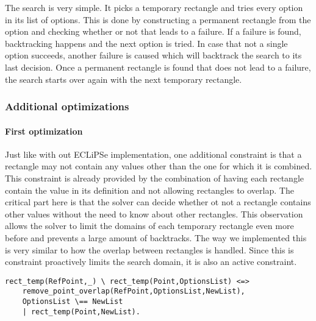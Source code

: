 The search is very simple. It picks a temporary rectangle and tries every option in its list of options. This is done by constructing a permanent rectangle from the option and checking whether or not that leads to a failure. If a failure is found, backtracking happens and the next option is tried. In case that not a single option succeeds, another failure is caused which will backtrack the search to its last decision. Once a permanent rectangle is found that does not lead to a failure, the search starts over again with the next temporary rectangle.

\newpage
\subsubsection{Additional optimizations}
\paragraph{First optimization}
\label{sec:CHR_opti}
Just like with out ECLiPSe implementation, one additional constraint is that a rectangle may not contain any values other than the one for which it is combined. This constraint is already provided by the combination of having each rectangle contain the value in its definition and not allowing rectangles to overlap. The critical part here is that the solver can decide whether ot not a rectangle contains other values without the need to know about other rectangles. This observation allows the solver to limit the domains of each temporary rectangle even more before and prevents a large amount of backtracks. The way we implemented this is very similar to how the overlap between rectangles is handled. Since this is constraint proactively limits the search domain, it is also an active constraint.

\begin{lstlisting}
rect_temp(RefPoint,_) \ rect_temp(Point,OptionsList) <=>
	remove_point_overlap(RefPoint,OptionsList,NewList),
	OptionsList \== NewList
	| rect_temp(Point,NewList).
\end{lstlisting}


